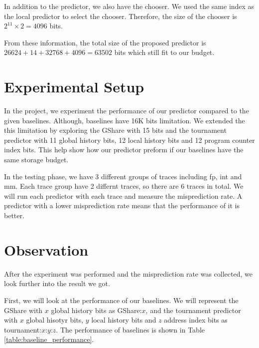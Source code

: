 \documentclass[conference]{IEEEtran}
\begin{document}
In addition to the predictor, we also have the chooser. We used the same index as the local predictor
to select the chooser. Therefore, the size of the chooser is $2^11 \times 2 = 4096$ bits.

From these information, the total size of the proposed predictor is
$26624 + 14 + 32768 + 4096 = 63502$ bits which still fit to our budget.

\section{Experimental Setup}

In the project, we experiment the performance of our predictor compared to the given baselines.
Although, baselines have 16K bits limitation. We extended the this limitation
by exploring the GShare with 15 bits and the tournament predictor with
11 global history bits, 12 local history bits and 12 program counter index bits.
This help show how our predictor preform if our baselines have the same storage budget.

In the testing phase, we have 3 different groups of traces including fp, int and mm.
Each trace group have 2 differnt traces, so there are 6 traces in total. We will run
each predictor with each trace and measure the misprediction rate. A predictor with a lower misprediction rate
means that the performance of it is better.

\section{Observation}

After the experiment was performed and the misprediction rate was collected, we look
further into the result we got.

First, we will look at the performance of our baselines. We will represent the
GShare with $x$ global history bits as GShare:$x$, and the tournament predictor
with $x$ global hisotyr bits, $y$ local history bits and $z$ address index bits
as tournament:$x$:$y$:$z$. The performance of baselines is shown in Table \ref{table:baseline_performance}.
\end{document}
